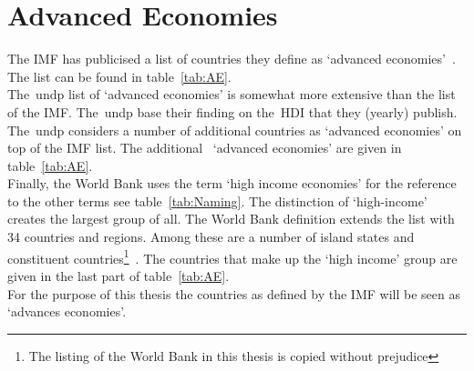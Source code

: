 \section{Advanced Economies}
The IMF has publicised a list of countries they define as `advanced economies'~\cite{InternationalMonetaryFund:2013vn}.
The list can be found in table~\ref{tab:AE}.\\
The~\gls{undp} list of `advanced economies' is somewhat more extensive than the list of the IMF\@.
The~\gls{undp} base their finding on the~\gls{HDI} that they (yearly) publish.
The~\gls{undp} considers a number of additional countries as `advanced economies' on top of the IMF list.
The additional~\cite{UNDP:2013vx} `advanced economies' are given in table~\ref{tab:AE}.\\
Finally, the World Bank uses the term `high income economies' for the reference to the other terms see table~\ref{tab:Naming}.
The distinction of `high-income' creates the largest group of all.
The World Bank definition extends the list with 34 countries and regions.
Among these are a number of island states and constituent countries\footnote{The listing of the World Bank in this thesis is copied without prejudice}~\cite{WorldBank:2013Country}.
The countries that make up the `high income' group are given in the last part of table~\ref{tab:AE}.\\
For the purpose of this thesis the countries as defined by the IMF will be seen as `advances economies'.


